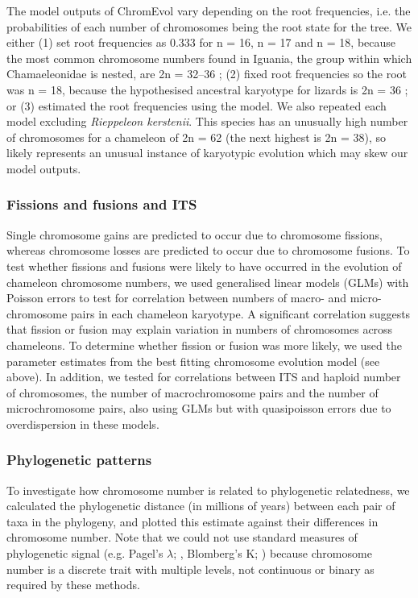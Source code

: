 \documentclass[a4paper, 12pt]{article}
\begin{document}
The model outputs of ChromEvol vary depending on the root frequencies, i.e. the probabilities of each number of chromosomes being the root state for the tree. 
We either (1) set root frequencies as 0.333 for n = 16, n = 17 and n = 18, because the most common chromosome numbers found in Iguania, the group within which Chamaeleonidae is nested, are 2n = 32–36 \citep{olmo2005chromorep}; (2) fixed root frequencies so the root was n = 18, because the hypothesised ancestral karyotype for lizards is 2n = 36 \citep{deakin2016anchoring,lisachov2021whole,mezzasalma2021lizards}; or (3) estimated the root frequencies using the model. 
We also repeated each model excluding \textit{Rieppeleon kerstenii}. 
This species has an unusually high number of chromosomes for a chameleon of 2n = 62 (the next highest is 2n = 38), so likely represents an unusual instance of karyotypic evolution which may skew our model outputs. 

\subsubsection{Fissions and fusions and ITS}
Single chromosome gains are predicted to occur due to chromosome fissions, whereas chromosome losses are predicted to occur due to chromosome fusions. 
To test whether fissions and fusions were likely to have occurred in the evolution of chameleon chromosome numbers, we used generalised linear models (GLMs) with Poisson errors to test for correlation between numbers of macro- and micro-chromosome pairs in each chameleon karyotype. 
A significant correlation suggests that fission or fusion may explain variation in numbers of chromosomes across chameleons.
To determine whether fission or fusion was more likely, we used the parameter estimates from the best fitting chromosome evolution model (see above). 
In addition, we tested for correlations between ITS and haploid number of chromosomes, the number of macrochromosome pairs and the number of microchromosome pairs, also using GLMs but with quasipoisson errors due to overdispersion in these models.

\subsubsection{Phylogenetic patterns}
To investigate how chromosome number is related to phylogenetic relatedness, we calculated the phylogenetic distance (in millions of years) between each pair of taxa in the phylogeny, and plotted this estimate against their differences in chromosome number. 
Note that we could not use standard measures of phylogenetic signal (e.g. Pagel's $\lambda$; \citealt{pagel1999inferring}, Blomberg's K; \citealt{blomberg2003testing}) because chromosome number is a discrete trait with multiple levels, not continuous or binary as required by these methods. 
\end{document}
